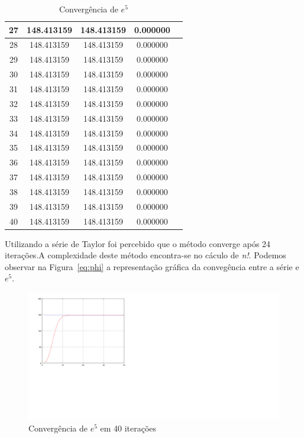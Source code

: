 \documentclass[a4paper]{article}
\begin{document}
\begin{table}[H]
\begin{tabular}{|c|c|c|c|c|}
		\hline
		27 & 148.413159 & 148.413159 & 0.000000\\
		\hline
		28 & 148.413159 & 148.413159 & 0.000000\\
		\hline
		29 & 148.413159 & 148.413159 & 0.000000\\
		\hline
		30 & 148.413159 & 148.413159 & 0.000000\\
		\hline
		31 & 148.413159 & 148.413159 & 0.000000\\
		\hline
		32 & 148.413159 & 148.413159 & 0.000000\\
		\hline
		33 & 148.413159 & 148.413159 & 0.000000\\
		\hline
		34 & 148.413159 & 148.413159 & 0.000000\\
		\hline
		35 & 148.413159 & 148.413159 & 0.000000\\
		\hline
		36 & 148.413159 & 148.413159 & 0.000000\\
		\hline
		37 & 148.413159 & 148.413159 & 0.000000\\
		\hline
		38 & 148.413159 & 148.413159 & 0.000000\\
		\hline
		39 & 148.413159 & 148.413159 & 0.000000\\
		\hline
		40 & 148.413159 & 148.413159 & 0.000000\\
		\hline
	\end{tabular}
	\label{ex_table}
	\caption{Convergência de $e^5$}
\end{table}

Utilizando a série de Taylor foi percebido que o método converge após 24
iterações.A complexidade deste método encontra-se no cáculo de \emph{n!}.
Podemos observar na Figura~\ref{eq:phi} a representação gráfica da convegência
entre a série e $e^5$. 

\begin{figure}[H] \centering
	\includegraphics[scale=.75]{ex5.png} 
\caption{Convergência de $e^5$ em 40 iterações}
\label{ex5} 
\end{figure}
\end{document}
